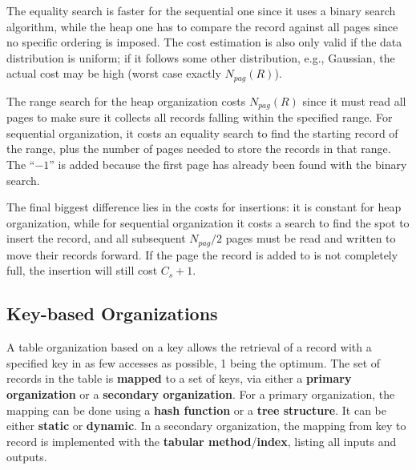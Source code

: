 The equality search is faster for the sequential one since it uses a binary search algorithm, while the heap one has to compare the record against all pages since no specific ordering is imposed. The cost estimation is also only valid if the data distribution is uniform; if it follows some other distribution, e.g., Gaussian, the actual cost may be high (worst case exactly $N_{pag}(R)$).

The range search for the heap organization costs $N_{pag}(R)$ since it must read all pages to make sure it collects all records falling within the specified range. For sequential organization, it costs an equality search to find the starting record of the range, plus the number of pages needed to store the records in that range. The ``$-1$'' is added because the first page has already been found with the binary search.

The final biggest difference lies in the costs for insertions: it is constant for heap organization, while for sequential organization it costs a search to find the spot to insert the record, and all subsequent $N_{pag}/2$ pages must be read and written to move their records forward. If the page the record is added to is not completely full, the insertion will still cost $C_s + 1$.

\subsection{Key-based Organizations}

A table organization based on a key allows the retrieval of a record with a specified key in as few accesses as possible, 1 being the optimum. The set of records in the table is \textbf{mapped} to a set of keys, via either a \textbf{primary organization} or a \textbf{secondary organization}.
For a primary organization, the mapping can be done using a \textbf{hash function} or a \textbf{tree structure}. It can be either \textbf{static} or \textbf{dynamic}.
In a secondary organization, the mapping from key to record is implemented with the \textbf{tabular method}/\textbf{index}, listing all inputs and outputs.

